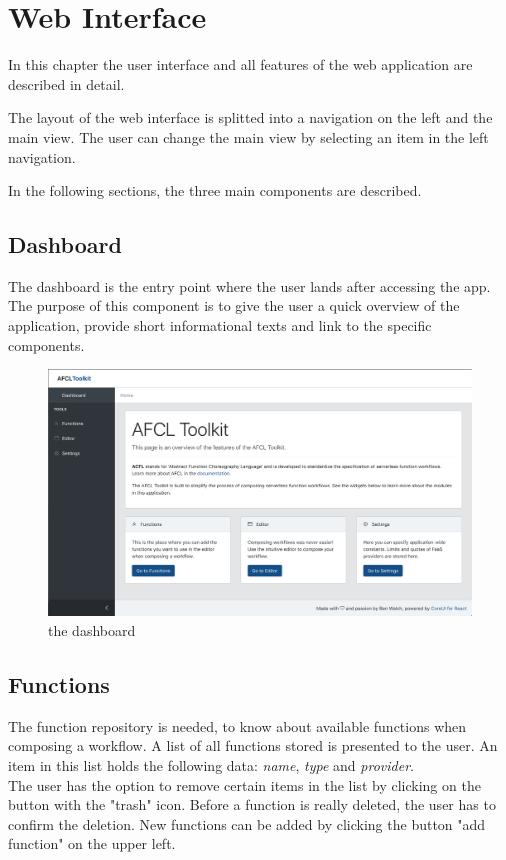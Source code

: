 \documentclass[a4paper,top=25mm,bottom=25mm,12pt,pdftex,halfparskip,twoside,bibtotoc,numbers=noenddot]{scrbook}
\begin{document}
\chapter{Web Interface}
\label{chap:impl-webinterface}

In this chapter the user interface and all features of the web application are described in detail.

The layout of the web interface is splitted into a navigation on the left and the main view. The user can change the main view by selecting an item in the left navigation.

In the following sections, the three main components are described.

\section{Dashboard}

The dashboard is the entry point where the user lands after accessing the app. The purpose of this component is to give the user a quick overview of the application, provide short informational texts and link to the specific components. 

\begin{figure}[H]
  \centering
  \includegraphics[width=\textwidth]{dashboard}
  \caption{the dashboard}
\end{figure}

\section{Functions}

The function repository is needed, to know about available functions when composing a workflow.  A list of all functions stored is presented to the user. An item in this list holds the following data: \textit{name}, \textit{type} and \textit{provider}.\\
The user has the option to remove certain items in the list by clicking on the button with the "trash" icon. Before a function is really deleted, the user has to confirm the deletion.
New functions can be added by clicking the button "add function" on the upper left.
\end{document}
